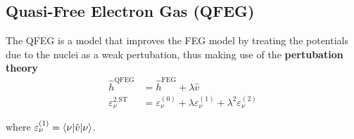 \documentclass{article}
\begin{document}
\newpage


\subsection{Quasi-Free Electron Gas (QFEG)}
The QFEG is a model that improves the FEG model by treating the potentials due to the nuclei as a weak pertubation, thus making use of the \textbf{pertubation theory}
	\begin{align}
		\hat{h}^\text{QFEG} &= \hat{h}^\text{FEG} + \lambda \hat{v} \\
		\varepsilon_\nu^\text{2.ST} &= \varepsilon_\nu^{(0)} + \lambda \varepsilon_\nu^{(1)} + \lambda^2 \varepsilon_\nu^{(2)}
	\end{align}

where $\varepsilon_\nu^{(1)} = \braket{ \nu | \hat{v} | \nu}$.

\vspace{0.5cm}
\end{document}
